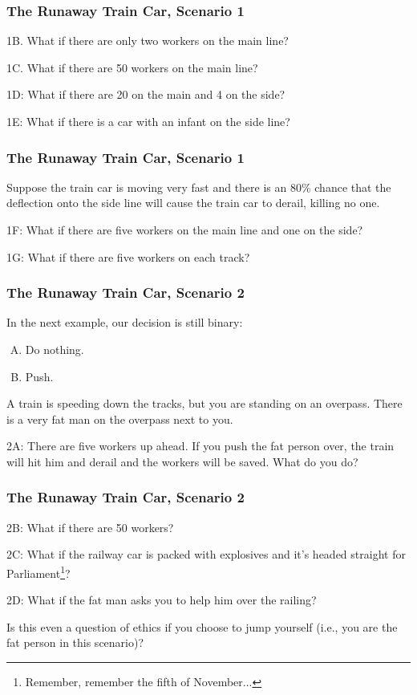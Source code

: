 \begin{frame}
\frametitle{The Runaway Train Car, Scenario 1}

1B. What if there are only two workers on the main line?

1C. What if there are 50 workers on the main line?

1D: What if there are 20 on the main and 4 on the side?

1E: What if there is a car with an infant on the side line?

\end{frame}



\begin{frame}
\frametitle{The Runaway Train Car, Scenario 1}

Suppose the train car is moving very fast and there is an 80\% chance that the deflection onto the side line will cause the train car to derail, killing no one.

1F: What if there are five workers on the main line and one on the side?

1G: What if there are five workers on each track?


\end{frame}


\begin{frame}
\frametitle{The Runaway Train Car, Scenario 2}

In the next example, our decision is still binary:\\

\begin{enumerate}[A.]
	\item Do nothing.
	\item Push.
\end{enumerate}

A train is speeding down the tracks, but you are standing on an overpass. There is a very fat man on the overpass next to you. 

2A: There are five workers up ahead. If you push the fat person over, the train will hit him and derail and the workers will be saved. What do you do?


\end{frame}

\begin{frame}
\frametitle{The Runaway Train Car, Scenario 2}

2B: What if there are 50 workers?

2C: What if the railway car is packed with explosives and it's headed straight for Parliament\footnote{Remember, remember the fifth of November...}?

2D: What if the fat man asks you to help him over the railing?

Is this even a question of ethics if you choose to jump yourself (i.e., you are the fat person in this scenario)?


\end{frame}



